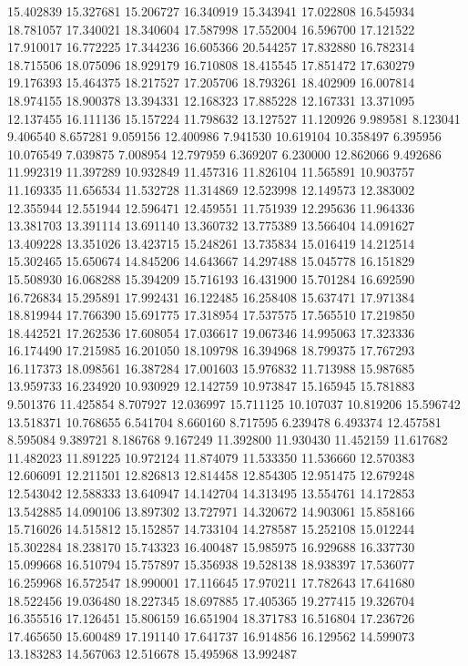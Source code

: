 15.402839
15.327681
15.206727
16.340919
15.343941
17.022808
16.545934
18.781057
17.340021
18.340604
17.587998
17.552004
16.596700
17.121522
17.910017
16.772225
17.344236
16.605366
20.544257
17.832880
16.782314
18.715506
18.075096
18.929179
16.710808
18.415545
17.851472
17.630279
19.176393
15.464375
18.217527
17.205706
18.793261
18.402909
16.007814
18.974155
18.900378
13.394331
12.168323
17.885228
12.167331
13.371095
12.137455
16.111136
15.157224
11.798632
13.127527
11.120926
9.989581
8.123041
9.406540
8.657281
9.059156
12.400986
7.941530
10.619104
10.358497
6.395956
10.076549
7.039875
7.008954
12.797959
6.369207
6.230000
12.862066
9.492686
11.992319
11.397289
10.932849
11.457316
11.826104
11.565891
10.903757
11.169335
11.656534
11.532728
11.314869
12.523998
12.149573
12.383002
12.355944
12.551944
12.596471
12.459551
11.751939
12.295636
11.964336
13.381703
13.391114
13.691140
13.360732
13.775389
13.566404
14.091627
13.409228
13.351026
13.423715
15.248261
13.735834
15.016419
14.212514
15.302465
15.650674
14.845206
14.643667
14.297488
15.045778
16.151829
15.508930
16.068288
15.394209
15.716193
16.431900
15.701284
16.692590
16.726834
15.295891
17.992431
16.122485
16.258408
15.637471
17.971384
18.819944
17.766390
15.691775
17.318954
17.537575
17.565510
17.219850
18.442521
17.262536
17.608054
17.036617
19.067346
14.995063
17.323336
16.174490
17.215985
16.201050
18.109798
16.394968
18.799375
17.767293
16.117373
18.098561
16.387284
17.001603
15.976832
11.713988
15.987685
13.959733
16.234920
10.930929
12.142759
10.973847
15.165945
15.781883
9.501376
11.425854
8.707927
12.036997
15.711125
10.107037
10.819206
15.596742
13.518371
10.768655
6.541704
8.660160
8.717595
6.239478
6.493374
12.457581
8.595084
9.389721
8.186768
9.167249
11.392800
11.930430
11.452159
11.617682
11.482023
11.891225
10.972124
11.874079
11.533350
11.536660
12.570383
12.606091
12.211501
12.826813
12.814458
12.854305
12.951475
12.679248
12.543042
12.588333
13.640947
14.142704
14.313495
13.554761
14.172853
13.542885
14.090106
13.897302
13.727971
14.320672
14.903061
15.858166
15.716026
14.515812
15.152857
14.733104
14.278587
15.252108
15.012244
15.302284
18.238170
15.743323
16.400487
15.985975
16.929688
16.337730
15.099668
16.510794
15.757897
15.356938
19.528138
18.938397
17.536077
16.259968
16.572547
18.990001
17.116645
17.970211
17.782643
17.641680
18.522456
19.036480
18.227345
18.697885
17.405365
19.277415
19.326704
16.355516
17.126451
15.806159
16.651904
18.371783
16.516804
17.236726
17.465650
15.600489
17.191140
17.641737
16.914856
16.129562
14.599073
13.183283
14.567063
12.516678
15.495968
13.992487

